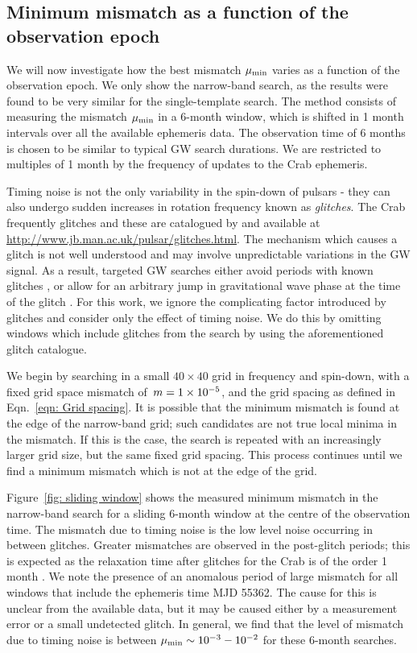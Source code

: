 \documentclass[../full_thesis/full_thesis.tex]{subfiles}
\begin{document}
\subsection{Minimum mismatch as a function of the observation epoch}
\label{sec: Minimum mismatch as a function of the observation epoch}

We will now investigate how the best mismatch $\mu_{\mathrm{min}}$ varies as a function of
the observation epoch. We only show the narrow-band search, as the results were
found to be very similar for the single-template search. The method consists of
measuring the mismatch $\mu_{\mathrm{min}}$ in a 6-month window, which is shifted in 1
month intervals over all the available ephemeris data. The observation time of
6 months is chosen to be similar to typical GW search durations. We are
restricted to multiples of 1 month by the frequency of updates to the Crab
ephemeris.

Timing noise is not the only variability in the spin-down of pulsars - they can
also undergo sudden increases in rotation frequency known as \emph{glitches}.
The Crab frequently glitches and these are catalogued by \citet{Espinoza2011}
and available at \url{http://www.jb.man.ac.uk/pulsar/glitches.html}.
The mechanism which causes a glitch is not well understood and may involve
unpredictable variations in the GW signal. As a result, targeted GW searches
either avoid periods with known glitches \citep{ligo2008}, or
allow for an arbitrary jump in gravitational wave phase at the time of
the glitch \citep{ligo2010}. For this work, we ignore
the complicating factor introduced by glitches and consider
only the effect of timing noise. We do this by
omitting windows which include glitches from the search by using
the aforementioned glitch catalogue.

We begin by searching in a small
$40\times40$ grid in frequency and spin-down, with a fixed grid space
mismatch of~$m=1\times10^{-5}$, and the grid spacing as defined in
Eqn.~\eqref{eqn: Grid spacing}. It is possible that the minimum mismatch is
found at the edge of the narrow-band grid; such candidates  are not true local
minima in the mismatch. If this is the case, the search is repeated with an
increasingly larger grid size, but the same fixed grid spacing.  This process
continues until we find a minimum mismatch which is not at the edge of the
grid.

Figure~\ref{fig: sliding window} shows the measured minimum mismatch in the
narrow-band search for a sliding 6-month window at the centre of the
observation time. The mismatch due to timing noise is the low level noise
occurring in between glitches. Greater mismatches are observed in the
post-glitch periods; this is expected as the relaxation time after glitches for
the Crab is of the order 1 month \citep{Lyne2012book}.  We note the presence of
an anomalous period of large mismatch for all  windows that include the
ephemeris time MJD 55362. The cause for this is unclear from the available
data, but it may be caused either by a measurement error or a small undetected
glitch. In general, we find that the level of mismatch due to timing noise is
between $\mu_{\mathrm{min}} \sim 10^{-3} - 10^{-2}$ for these 6-month searches.
\end{document}
